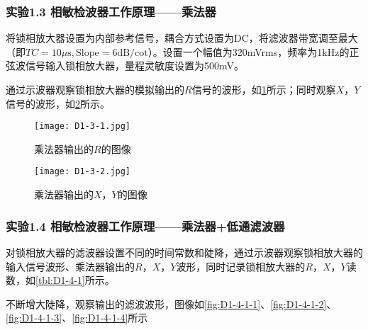 \documentclass[dvipsnames, svgnames,a4paper,11pt]{article}
\begin{document}
	\subsubsection*{实验1.3 \quad 相敏检波器工作原理——乘法器}

	将锁相放大器设置为内部参考信号，耦合方式设置为DC，将滤波器带宽调至最大（即$TC = 10 \mu\text{s}, \text{Slope} = 6 \text{dB/cot}$）。设置一个幅值为320mVrms，频率为1kHz的正弦波信号输入锁相放大器，量程灵敏度设置为500mV。
	
	通过示波器观察锁相放大器的模拟输出的$R$信号的波形，如\cref{fig:D1-3-1}所示；同时观察$X$，$Y$信号的波形，如\cref{fig:D1-3-2}所示。



	\begin{figure}[htbp]
		\centering
		\texttt{[image: D1-3-1.jpg]}
		\caption{乘法器输出的$R$的图像}
		\label{fig:D1-3-1}
	\end{figure}


	\begin{figure}[htbp]
		\centering
		\texttt{[image: D1-3-2.jpg]}
		\caption{乘法器输出的$X$，$Y$的图像}
		\label{fig:D1-3-2}
	\end{figure}









	\subsubsection*{实验1.4 \quad 相敏检波器工作原理——乘法器+低通滤波器}

	对锁相放大器的滤波器设置不同的时间常数和陡降，通过示波器观察锁相放大器的输入信号波形、乘法器输出的$R$，$X$，$Y$波形，同时记录锁相放大器的$R$，$X$，$Y$读数，如\cref{tbl:D1-4-1}所示。



	不断增大陡降，观察输出的滤波波形，图像如\cref{fig:D1-4-1-1}、\cref{fig:D1-4-1-2}、\cref{fig:D1-4-1-3}、\cref{fig:D1-4-1-4}所示
\end{document}
